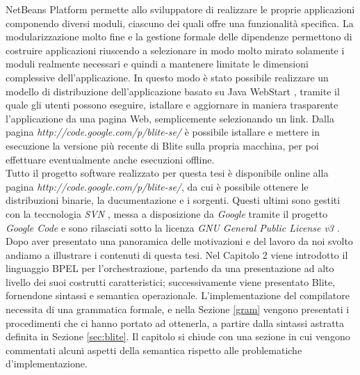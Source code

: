 NetBeans Platform permette allo sviluppatore di realizzare le proprie
applicazioni componendo diversi moduli, ciascuno dei quali offre una
funzionalità specifica. La modularizzazione molto fine e la gestione
formale delle dipendenze permettono di costruire applicazioni riuscendo a
selezionare in modo molto mirato solamente i moduli realmente necessari e
quindi a mantenere limitate le dimensioni complessive dell'applicazione. 
In questo modo è stato possibile realizzare un modello di distribuzione
dell'applicazione basato su Java WebStart \cite{JavaWS}, tramite il quale gli
utenti possono eseguire, istallare e aggiornare in maniera trasparente l'applicazione
da una pagina Web, semplicemente selezionando un link. Dalla pagina 
\emph{http://code.google.com/p/blite-se/} è possibile istallare e mettere in
esecuzione la versione più recente di Blite sulla propria macchina,
per poi effettuare eventualmente anche esecuzioni offline.
\\

Tutto il progetto software realizzato per questa tesi è disponibile online alla
pagina \emph{http://code.google.com/p/blite-se/}, da cui è possibile ottenere le
distribuzioni binarie, la ducumentazione e i sorgenti. Questi ultimi sono
gestiti con la teccnologia \emph{SVN} \cite{SVN}, messa a disposizione da
\emph{Google} tramite il progetto \emph{Google Code} \cite{GCode} e sono rilasciati
sotto la licenza \emph{GNU General Public License v3} \cite{GPLv3}.
\\

% 

Dopo aver presentato una panoramica delle motivazioni e del lavoro da noi svolto
andiamo a illustrare i contenuti di questa tesi. Nel Capitolo 2 viene introdotto
il linguaggio BPEL per l'orchestrazione, partendo da una presentazione ad alto
livello dei suoi costrutti caratteristici; successivamente viene presentato
Blite, fornendone sintassi e semantica operazionale.
L'implementazione del compilatore necessita di una grammatica formale, e nella
Sezione \ref{gram} vengono presentati i procedimenti che ci hanno portato ad
ottenerla, a partire dalla sintassi astratta definita in Sezione \ref{sec:blite}. Il
capitolo si chiude con una sezione in cui vengono commentati alcuni aspetti
della semantica rispetto alle problematiche d'implementazione.

